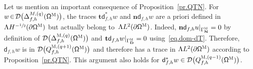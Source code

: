 \documentclass[JEP,XML,SOM,Unicode,NoEqCountersInSection,NoFloatCountersInSection,published]{cedram}
\newcommand{\mbf}[1]{\mathbf{#1}}
\let\pa\partial
\theoremstyle{plain}
\theoremstyle{definition}
\begin{document}
\noindent
Let us mention an important consequence of
Proposition~\ref{pr.QTN}. For $w\!\in\! \mathcal D\bigl(\Delta_{f,h}^{M,(q)} (\mathsf \Omega^{\textsc{M}})\bigr)$, the
traces $\mathbf{t}\mathsf d^*_{f,h}w$ and $\mathbf{n} \mathsf d_{f,h}
w$ are a priori defined in $ \Lambda H^{-\sfrac12} (\pa \mathsf \Omega^{\textsc{M}})$ but actually belong
to~$ \Lambda L^{2} (\pa \mathsf \Omega^{\textsc{M}})$. Indeed,
$\mathbf{n}\mathsf d_{f,h}u|_{\Gamma^{\textsc{M}}_{\mbf N}}=0$ by
definition of $\mathcal D\bigl(\Delta_{f,h}^{\textsc{M},(q)} (\mathsf
\Omega^{\textsc{M}})\bigr)$ and $\mathbf t \mathsf
d_{f,h}w|_{\Gamma^{\textsc{M}}_{\mbf D}}=0$ using~\eqref{eq.dom-dT}. Therefore,
$\mathsf d_{f,h}w$ is in $\mathcal D\bigl(Q^{\textsc{M},(q+1)}_{f,h} (\mathsf \Omega^{\textsc{M}}) \bigr)$ and therefore has
a trace in $ \Lambda L^{2} (\partial \mathsf \Omega^{\textsc{M}})$ according to Proposition~\ref{pr.QTN}. This argument also holds for $\mathsf d^{*}_{f,h}w\in \mathcal D\bigl(Q^{\textsc{M},(q-1)}_{f,h} (\mathsf \Omega^{\textsc{M}})\bigr)$.
\end{document}
